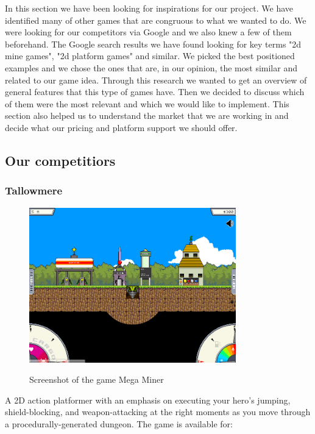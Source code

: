 \documentclass[12p]{article}
\begin{document}
In this section we have been looking for inspirations for our project. We have identified many of other games that are congruous to what we wanted to do.
We were looking for our competitors via Google and we also knew a few of them beforehand. The Google search results we have found looking for key terms "2d mine games", "2d platform games" and similar. We picked the best positioned examples and we chose the ones that are, in our opinion, the most similar and related to our game idea. Through this research we wanted to get an overview of general features that this type of games have. Then we decided to discuss which of them were the most relevant and which we would like to implement. This section also helped us to understand the market that we are working in and decide what our pricing and platform support we should offer.

\subsection{Our competitiors}
\subsubsection{Tallowmere} \label{StateOfTheArt_Tallowmere}

\begin{figure}[ht]
  \center
  \includegraphics[width=0.8\textwidth]{StateOfTheArtScreenshots/mega_miner}
  \label{StateOfTheArt_Screenshots_Tallowmere}
  \caption{Screenshot of the game Mega Miner \cite{MegaMinerScreenshot}}
\end{figure}

A 2D action platformer with an emphasis on executing your hero's jumping, shield-blocking, and weapon-attacking at the right moments as you move through a procedurally-generated dungeon. The game is available for:
\end{document}
